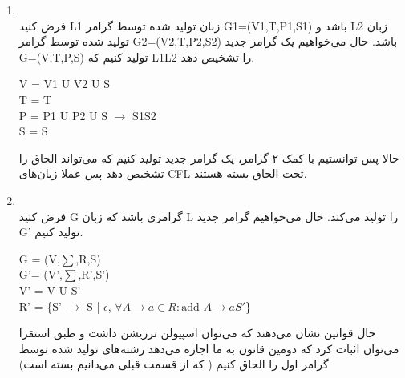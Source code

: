 \begin{enumerate}
    \item \phantom{text}
          \\
          فرض کنید L1 زبان تولید شده توسط گرامر G1=(V1,T,P1,S1) باشد و L2 زبان تولید شده توسط گرامر G2=(V2,T,P2,S2) باشد. حال می‌خواهیم
          یک گرامر جدید G=(V,T,P,S) تولید کنیم که L1L2 را تشخیص دهد.
          \\
          \begin{latin}
              V = V1 U V2 U {S}\\
              T = T\\
              P = P1 U P2 U {S $\rightarrow$ S1S2}\\
              S = S
          \end{latin}
          حالا پس توانستیم با کمک ۲ گرامر،‌ یک گرامر جدید تولید کنیم که می‌تواند الحاق را تشخیص دهد پس عملا زبان‌های CFL تحت الحاق بسته هستند.

    \item \phantom{text}
    \\
    فرض کنید G گرامری باشد که زبان L را تولید می‌کند. حال می‌خواهیم گرامر جدید G' تولید کنیم.
    \begin{latin}
        G = (V,$\sum$,R,S)\\
        G'= (V',$\sum$,R',S')\\
        V' = V U {S'}\\
        R' = \{S' $\rightarrow$ S | $\epsilon$, $\forall A \rightarrow a \in R : \text{add }A \rightarrow aS'$\}
    \end{latin}
    حال قوانین نشان می‌دهند که می‌توان اسپیولن ترزیشن داشت و طبق استقرا می‌توان اثبات کرد که دومین قانون به ما اجازه می‌دهد رشته‌های تولید شده توسط گرامر اول را الحاق کنیم ( که از قسمت قبلی می‌دانیم بسته است)
\end{enumerate}
